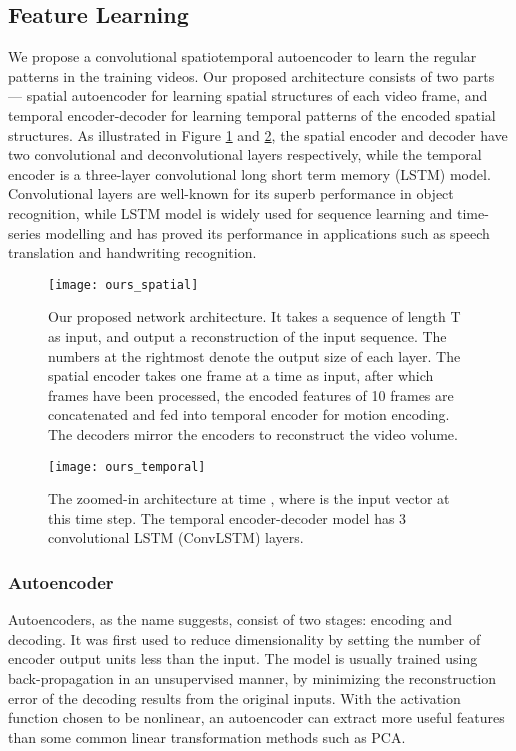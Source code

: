 \documentclass[a4paper]{article}
\begin{document}
\subsection{Feature Learning}

We propose a convolutional spatiotemporal autoencoder to learn the regular patterns in the training videos. Our proposed architecture consists of two parts --- spatial autoencoder for learning spatial structures of each video frame, and temporal encoder-decoder for learning temporal patterns of the encoded spatial structures. As illustrated in Figure \ref{fig:ours_spatial} and \ref{fig:ours_temporal}, the spatial encoder and decoder have two convolutional and deconvolutional layers respectively, while the temporal encoder is a three-layer convolutional long short term memory (LSTM) model. Convolutional layers are well-known for its superb performance in object recognition, while LSTM model is widely used for sequence learning and time-series modelling and has proved its performance in applications such as speech translation and handwriting recognition.

\begin{figure}
	\centering
	\texttt{[image: ours\_spatial]}
	\caption{Our proposed network architecture. It takes a sequence of length T as input, and output a reconstruction of the input sequence. The numbers at the rightmost denote the output size of each layer. The spatial encoder takes one frame at a time as input, after which  frames have been processed, the encoded features of 10 frames are concatenated and fed into temporal encoder for motion encoding. The decoders mirror the encoders to reconstruct the video volume.}
	\label{fig:ours_spatial}
\end{figure}

\begin{figure}
	\centering
	\texttt{[image: ours\_temporal]}
	\caption{The zoomed-in architecture at time , where  is the input vector at this time step. The temporal encoder-decoder model has 3 convolutional LSTM (ConvLSTM) layers. }
	\label{fig:ours_temporal}
\end{figure}

\subsubsection{Autoencoder}

Autoencoders, as the name suggests, consist of two stages: encoding and decoding. It was first used to reduce dimensionality by setting the number of encoder output units less than the input. The model is usually trained using back-propagation in an unsupervised manner,
by minimizing the reconstruction error of the decoding results from the original inputs. With the activation function chosen to be nonlinear, an autoencoder can extract more useful features than some common linear transformation methods such as PCA.
\end{document}

